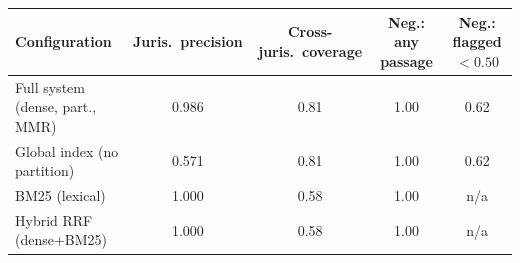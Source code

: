 \begin{tabular}{@{}lcccc@{}}
\toprule
Configuration & Juris.\ precision & Cross-juris.\ coverage & Neg.: any passage & Neg.: flagged $<0.50$ \\
\midrule
Full system (dense, part., MMR) & 0.986 & 0.81 & 1.00 & 0.62 \\
Global index (no partition) & 0.571 & 0.81 & 1.00 & 0.62 \\
BM25 (lexical) & 1.000 & 0.58 & 1.00 & n/a \\
Hybrid RRF (dense+BM25) & 1.000 & 0.58 & 1.00 & n/a \\
\bottomrule
\end{tabular}
